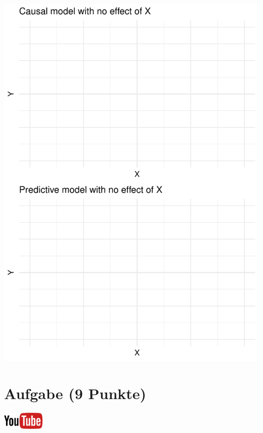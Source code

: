\documentclass[a4paper, 10pt]{scrartcl}\usepackage[]{graphicx}\usepackage[]{xcolor}
\makeatletter
\def\maxwidth{ %
  \ifdim\Gin@nat@width>\linewidth
    \linewidth
  \else
    \Gin@nat@width
  \fi
}
\makeatother
\begin{document}
{\centering \includegraphics[width=\maxwidth]{img/modeling-01-1} 

}



 
\clearpage

\section{Aufgabe \hfill (9 Punkte)}

\hfill\href{https://youtu.be/fB6nF4dxodA}{\includegraphics[width =
  2cm]{img/youtube}}\\[1Ex]
\end{document}
